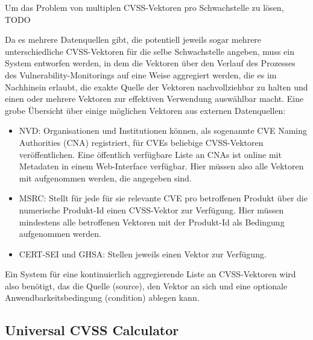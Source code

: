 Um das Problem von multiplen CVSS-Vektoren pro Schwachstelle zu lösen, TODO

Da es mehrere Datenquellen gibt, die potentiell jeweils sogar mehrere unterschiedliche CVSS-Vektoren für die selbe Schwachstelle angeben, muss ein System entworfen werden, in dem die Vektoren über den Verlauf des Prozesses des Vulnerability-Monitorings auf eine Weise aggregiert werden, die es im Nachhinein erlaubt, die exakte Quelle der Vektoren nachvollziehbar zu halten und einen oder mehrere Vektoren zur effektiven Verwendung auswählbar macht.
Eine grobe Übersicht über einige möglichen Vektoren aus externen Datenquellen:

\begin{itemize}
    \item NVD:
    Organisationen und Institutionen können, als sogenannte CVE Naming Authorities (CNA) registriert, für CVEs beliebige CVSS-Vektoren veröffentlichen.
    Eine öffentlich verfügbare Liste an CNAs ist online mit Metadaten in einem Web-Interface verfügbar.
    Hier müssen also alle Vektoren mit aufgenommen werden, die angegeben sind.
    \item MSRC:
    Stellt für jede für sie relevante CVE pro betroffenen Produkt über die numerische Produkt-Id einen CVSS-Vektor zur Verfügung.
    Hier müssen mindestens alle betroffenen Vektoren mit der Produkt-Id als Bedingung aufgenommen werden.
    \item CERT-SEI und GHSA: Stellen jeweils einen Vektor zur Verfügung.
\end{itemize}

Ein System für eine kontinuierlich aggregierende Liste an CVSS-Vektoren wird also benötigt, das die Quelle (source), den Vektor an sich und eine optionale Anwendbarkeitsbedingung (condition) ablegen kann.


\subsection{Universal CVSS Calculator} \label{subsec:projektbericht-loesungsweg-typescript-cvss-online-calculator}
